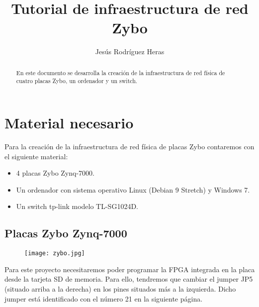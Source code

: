 \documentclass[12pt,letterpaper]{article}
\title{Tutorial de infraestructura de red Zybo}
\author{Jesús Rodríguez Heras}
\begin{document}
	
	\maketitle
	\begin{abstract} %
		\begin{center}
			En este documento se desarrolla la creación de la infraestructura de red física de cuatro placas Zybo, un ordenador y un switch.
		\end{center}
	\end{abstract}
	\thispagestyle{empty}
	\newpage
	
	\tableofcontents
	\newpage
	
	
	
	
	\lstset{language=bash, numbers=left, numberstyle=\tiny, numbersep=10pt, firstnumber=1, stepnumber=1, basicstyle=\small\ttfamily, tabsize=1, extendedchars=true, inputencoding=latin1}


\section{Material necesario}
Para la creación de la infraestructura de red física de placas Zybo contaremos con el siguiente material:
\begin{itemize}
	\item 4 placas Zybo Zynq-7000.
	\item Un ordenador con sistema operativo Linux (Debian 9 Stretch) y Windows 7.
	\item Un switch tp-link modelo TL-SG1024D.
\end{itemize}


\subsection{Placas Zybo Zynq-7000}
\begin{figure}[h]
	\centering
	\texttt{[image: zybo.jpg]}
\end{figure}
Para este proyecto necesitaremos poder programar la FPGA integrada en la placa desde la tarjeta SD de memoria. Para ello, tendremos que cambiar el jumper JP5 (situado arriba a la derecha) en los pines situados más a la izquierda. Dicho jumper está identificado con el número 21 en la siguiente página.
\end{document}
